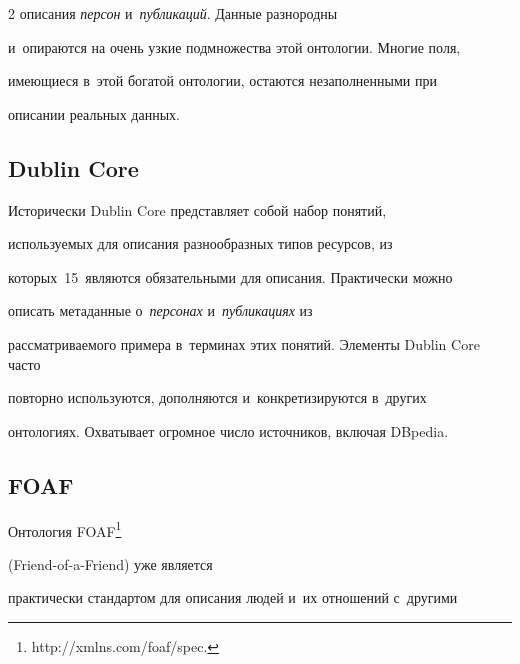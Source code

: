 \begin{multicols}{2}
описания \textit{персон} и~\textit{пуб\-ли\-ка\-ций}. Данные разнородны 

и~опираются на очень узкие подмножества этой онтологии. Многие поля, 

имеющиеся в~этой богатой онтологии, остаются незаполненными при 

описании реальных данных.



\vspace*{-4pt}

     

     \subsection*{Dublin Core}

     

\vspace*{-2pt}

     

    Исторически Dublin Core представляет собой набор понятий, 

используемых для описания разнообразных типов ресурсов, из 

которых~15~являются обязательными для описания. Практически можно 

описать метаданные о~\textit{персонах} и~\textit{пуб\-ли\-ка\-ци\-ях} из 

рассматриваемого примера в~терминах этих понятий. Элементы Dublin Core часто 

повторно используются, дополняются и~конкретизируются в~других 

онтологиях. Охватывает огромное число источников, включая DBpedia.



\vspace*{-4pt}

    

     \subsection*{FOAF}

     

\vspace*{-2pt}

     

    Онтология FOAF\footnote[4]{{\sf http://xmlns.com/foaf/spec.}}

    (Friend-of-a-Friend)  уже является 

практически стандартом для описания людей и~их отношений с~другими 


\end{multicols}
